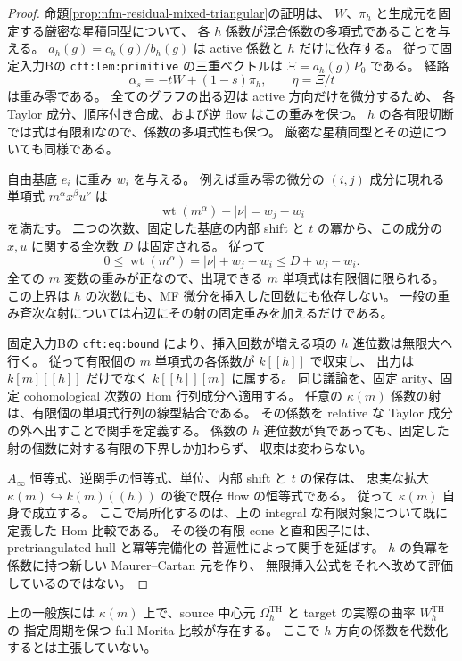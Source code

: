 \begin{proof}
命題\ref{prop:nfm-residual-mixed-triangular}の証明は、
$W$、$\pi_h$ と生成元を固定する厳密な星積同型について、
各 $h$ 係数が混合係数の多項式であることを与える。
$a_h(g)=c_h(g)/b_h(g)$ は active 係数と $h$ だけに依存する。
従って固定入力Bの \texttt{cft:lem:primitive} の三重ベクトルは
$\Xi=a_h(g)P_0$ である。
経路
\[
 \alpha_s=-tW+(1-s)\pi_h,\qquad
 \eta=\Xi/t
\]
は重み零である。
全てのグラフの出る辺は active 方向だけを微分するため、
各 Taylor 成分、順序付き合成、および逆 flow はこの重みを保つ。
$h$ の各有限切断では式は有限和なので、係数の多項式性も保つ。
厳密な星積同型とその逆についても同様である。

自由基底 $e_i$ に重み $w_i$ を与える。
例えば重み零の微分の $(i,j)$ 成分に現れる単項式
$m^\alpha x^\beta u^\nu$ は
\[
 \operatorname{wt}(m^\alpha)-|\nu|=w_j-w_i
\]
を満たす。
二つの次数、固定した基底の内部 shift と $t$ の冪から、この成分の
$x,u$ に関する全次数 $D$ は固定される。
従って
\[
 0\le\operatorname{wt}(m^\alpha)
       =|\nu|+w_j-w_i\le D+w_j-w_i.
\]
全ての $m$ 変数の重みが正なので、出現できる $m$ 単項式は有限個に限られる。
この上界は $h$ の次数にも、MF 微分を挿入した回数にも依存しない。
一般の重み斉次な射については右辺にその射の固定重みを加えるだけである。

固定入力Bの \texttt{cft:eq:bound} により、挿入回数が増える項の
$h$ 進位数は無限大へ行く。
従って有限個の $m$ 単項式の各係数が $k[[h]]$ で収束し、
出力は $k[m][[h]]$ だけでなく $k[[h]][m]$ に属する。
同じ議論を、固定 arity、固定 cohomological 次数の Hom 行列成分へ適用する。
任意の $\kappa(m)$ 係数の射は、有限個の単項式行列の線型結合である。
その係数を relative な Taylor 成分の外へ出すことで関手を定義する。
係数の $h$ 進位数が負であっても、固定した射の個数に対する有限の下界しか加わらず、
収束は変わらない。

$A_\infty$ 恒等式、逆関手の恒等式、単位、内部 shift と $t$ の保存は、
忠実な拡大 $\kappa(m)\hookrightarrow k(m)((h))$ の後で既存 flow の恒等式である。
従って $\kappa(m)$ 自身で成立する。
ここで局所化するのは、上の integral な有限対象について既に定義した Hom 比較である。
その後の有限 cone と直和因子には、pretriangulated hull と冪等完備化の
普遍性によって関手を延ばす。
$h$ の負冪を係数に持つ新しい Maurer--Cartan 元を作り、
無限挿入公式をそれへ改めて評価しているのではない。
\end{proof}

\begin{proposition}[混合係数を有理的に保つ周期付き CF 比較]
\label{prop:nfm-period-comparison-mixed-rational}
上の一般族には $\kappa(m)$ 上で、source 中心元
$\Omega_h^{\mathrm{TH}}$ と target の実際の曲率 $W_h^{\mathrm{TH}}$ の
指定周期を保つ full Morita 比較が存在する。
ここで $h$ 方向の係数を代数化するとは主張していない。
\end{proposition}

